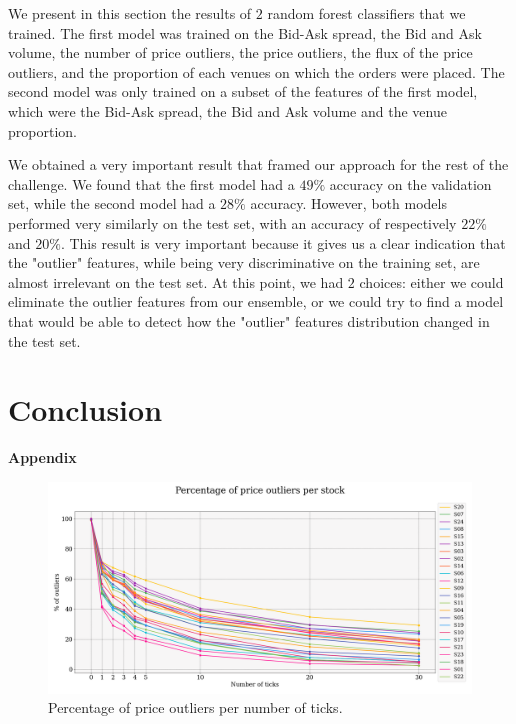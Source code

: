 \documentclass[switch, 11pt]{article}
\begin{document}
\begin{multicols}{2}
    We present in this section the results of $2$ random forest classifiers that we trained. The first model was trained on the Bid-Ask spread, the Bid and Ask volume, the number of price outliers, the price outliers, the flux of the price outliers, and the proportion of each venues on which the orders were placed. The second model was only trained on a subset of the features of the first model, which were the Bid-Ask spread, the Bid and Ask volume and the venue proportion.

    We obtained a very important result that framed our approach for the rest of the challenge. We found that the first model had a $49\%$ accuracy on the validation set, while the second model had a $28\%$ accuracy. However, both models performed very similarly on the test set, with an accuracy of respectively $22\%$ and $20\%$. This result is very important because it gives us a clear indication that the "outlier" features, while being very discriminative on the training set, are almost irrelevant on the test set. At this point, we had $2$ choices: either we could eliminate the outlier features from our ensemble, or we could try to find a model that would be able to detect how the "outlier" features distribution changed in the test set.

    \section{Conclusion}

    \newpage
    

\end{multicols}

\newpage
\appendix
\begin{center}
    {\Large \bfseries Appendix} \\
\end{center}
\begin{figure}[H]
    \centering
    \includegraphics[width=\columnwidth]{figures/percentage_outliers_per_stock.png}
    \caption{Percentage of price outliers per number of ticks.}
    \label{fig:nb_outliers}
\end{figure}
\end{document}
